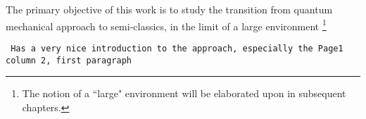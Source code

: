 The primary objective of this work is to study the transition from quantum mechanical approach 
to semi-classics, in the limit of a  large environment
\footnote{The notion of a ``large" environment will be elaborated upon
in subsequent chapters.}


\texttt{\cite{Mendes_2019} Has a very nice introduction to the approach, especially the 
Page1 column 2, first paragraph}

\newpage